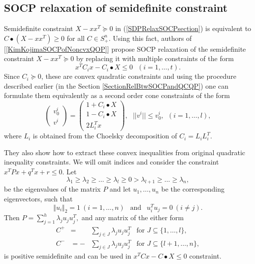 \documentclass[12pt]{book}
\theoremstyle{definition}
\begin{document}
\subsection{SOCP relaxation of semidefinite constraint}

Semidefinite constraint $X-xx^T\succeq 0$  in (\ref{SDPRelaxSOCPsection}) is equivalent to $C\bullet(X-xx^T)\geq 0$ for all $C\in S^n_+$. Using this fact, authors of  [\ref{KimKojimaSOCPofNoncvxQOP}] propose SOCP relaxation of the semidefinite constraint $X-xx^T\succeq 0$ by replacing it with multiple constraints of the form 
$$x^TC_ix-C_i\bullet X \leq 0 \ \ \ (i=1,\dots ,t).$$ 
Since $C_i\succeq 0$, these are convex quadratic constraints and using the procedure described earlier (in the Section \ref{SectionRelBtwSOCPandQCQP}) one can formulate them equivalently as a second order cone constraints of the form
\begin{equation}
\label{SOCPRelaxOfPSDconstraint}
\left(\begin{array}{c}
v^i_0\\
v^i
\end{array}\right)
= \left(\begin{array}{c}
1+C_i\bullet X\\
1-C_i\bullet X \\
2L_i^Tx
\end{array}\right), \ \ \ ||v^i||\leq v^i_0, \ \ (i  = 1,\dots ,l),
\end{equation}
where $L_i$ is obtained from the Choelsky decomposition of $C_i = L_iL_i^T.$

 They also show how to extract these convex inequalities from original quadratic inequality constraints. 
 We will omit indices and consider the constraint $x^TPx + q^Tx + r \leq 0$. Let
\begin{equation}
\label{SOCPeigenVals}
\lambda_1 \geq \lambda_2 \geq \dots \geq \lambda_l \geq 0 > \lambda_{l+1} \geq \dots \geq \lambda_n,
\end{equation}
be the eigenvalues of the matrix $P$ and let $u_1,\dots, u_n$ be the corresponding eigenvectors, such that 
\begin{equation}
\label{SOCPeigenVects}
\Vert u_i \Vert_2 = 1 \ (i = 1,\dots , n) \ \ \mbox{ and } \ \ u_i^Tu_j = 0 \ (i\neq j).
\end{equation}
Then $P = \sum_{j = 1}^{h}\lambda_j u_ju_j^T,$  and any matrix of the either form 
\begin{eqnarray}
C^+  &=  &  \sum_{j \in J} \lambda_j  u_ju_j^T \ \ \mbox{ for } J \subseteq \{ 1,\dots , l\}, \\
C^-  &=  - & \sum_{j \in J} \lambda_j u_ju_j^T \ \ \mbox{ for } J \subseteq \{ l+1,\dots , n\},
\end{eqnarray}
is positive semidefinite and can be used in $x^TCx-C\bullet X \leq 0$ constraint.
\end{document}
